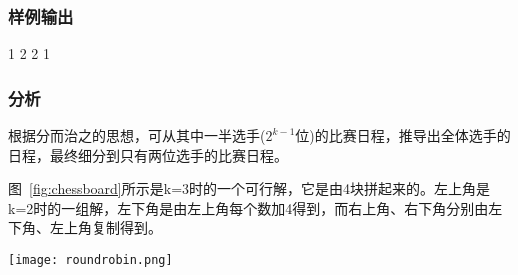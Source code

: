 \subsubsection{样例输出}
\begin{Code}
1 2
2 1
\end{Code}

\subsubsection{分析}
根据分而治之的思想，可从其中一半选手($2^{k-1}$位)的比赛日程，推导出全体选手的日程，最终细分到只有两位选手的比赛日程。

图~\ref{fig:chessboard}所示是k=3时的一个可行解，它是由4块拼起来的。左上角是k=2时的一组解，左下角是由左上角每个数加4得到，而右上角、右下角分别由左下角、左上角复制得到。
\begin{center}
\texttt{[image: roundrobin.png]}\\
\label{fig:roundrobin}
\end{center}

